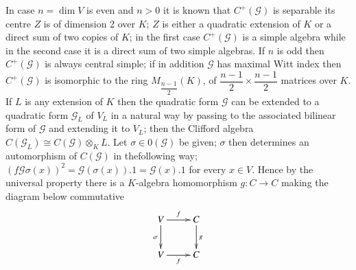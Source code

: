 In case $n = \dim V $ is even and $n>0$ it is known that $C^+
(\mathscr{G})$ is separable its centre $Z$ is of dimension 2 over
$K$; $Z$ is either a quadratic extension of $K$ or a direct sum of two
copies  of $K$; in the first case $C^+ (\mathscr{G})$ is a simple
algebra while in the second case it is a direct sum of two simple
algebras. If $n$ is odd then $C^+ (\mathscr{G})$ is  always central
simple; if in  addition $\mathscr{G}$ has maximal Witt index then $
C^+ (\mathscr{G})$  is isomorphic to the ring $M_{\dfrac{n-1}{2}} (K)$,
of  $\dfrac{n-1}{2} \times \dfrac{n-1}{2}$ matrices over $K$. If $L$ is
any extension of $K$ then the quadratic form $\mathscr{G}$ can be
extended to a quadratic form $\mathscr{G}_{L}$ of $V_{L}$ in a natural
way by passing to the associated bilinear form of $\mathscr{G}$ and
extending it to $V_{L}$; then the Clifford algebra  $C
(\mathscr{G}_{L}) \cong C (\mathscr{G}) \otimes _{K}L$. Let $\sigma
\in 0 (\mathscr{G})$ be given; $\sigma$ then determines an
automorphism of $C (\mathscr{G})$  in the\pageoriginale following way; $(f
\mathscr{G} \sigma (x))^2 = \mathscr{G} (\sigma (x)).1 = \mathscr{G}
(x).1$ for every  $x \in V$. Hence by the  universal property there is
a $K$-algebra homomorphism $g: C \rightarrow C$ making the diagram
below commutative 
\[
\xymatrix{
V \ar[r]^f \ar[d]_{\sigma} & C \ar[d]^g \\
V \ar[r]_f & C
}
\]

